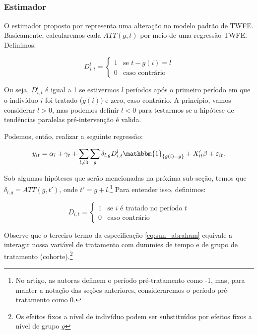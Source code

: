 \documentclass[portugues]{article}
\begin{document}
\subsection{\cite{sun2021estimating}} \label{sec:Sun}

\subsubsection{Estimador}

O estimador proposto por \cite{sun2021estimating} representa uma alteração no modelo padrão de TWFE. Basicamente, calcularemos cada $ATT(g,t)$ por meio de uma regressão TWFE. Definimos:

\[ D^l_{i,t} = \begin{cases} 1 & \text{se } t - g(i) = l \\
                             0 & \text{caso contrário} \end{cases} \]

Ou seja, $D^l_{i,t}$ é igual a 1 se estivermos $l$ períodos após o primeiro período em que o indivíduo $i$ foi tratado ($g(i)$) e zero, caso contrário. A princípio, vamos considerar $l>0$, mas podemos definir $l <0$ para testarmos se a hipótese de tendências paralelas pré-intervenção é valida.

Podemos, então, realizar a seguinte regressão:

\begin{equation}\label{eq:sun_abraham}
    y_{it} = \alpha_i + \gamma_t + \sum_{l \neq 0} \sum_{g} \delta_{l,g} D^l_{i,t} \mathbbm{1}_{\{g(i) = g\}} + X'_{it} \beta  + \varepsilon_{it}.
\end{equation}

Sob algumas hipóteses que serão mencionadas na próxima sub-seção, temos que $\delta_{l,g} = ATT(g,t')$, onde $t' = g + l$.\footnote{No artigo, as autoras definem o período pré-tratamento como -1, mas, para manter a notação das seções anteriores, consideraremos o período pré-tratamento como 0.} Para entender isso, definimos:

\[ D_{i,t} = \begin{cases} 1 & \text{se } i \text{ é tratado no período } t \\
                           0 & \text{caso contrário} \end{cases} \]

Observe que o terceiro termo da especificação \ref{eq:sun_abraham} equivale a  interagir nossa variável de tratamento com dummies de tempo e de grupo de tratamento (cohorte).\footnote{Os efeitos fixos a nível de indivíduo podem ser substituídos por efeitos fixos a nível de grupo $g$} 
\end{document}
